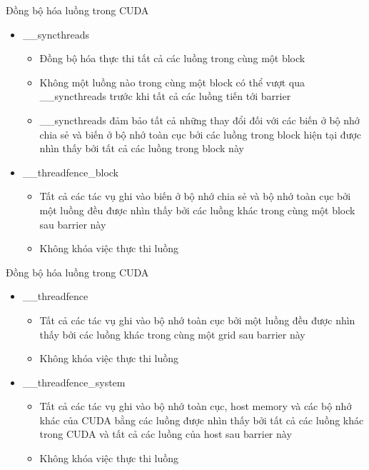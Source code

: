 \documentclass[10pt]{beamer}
\theoremstyle{remark}
\numberwithin{algocf}{section}
\numberwithin{equation}{section}
\numberwithin{dl}{section}
\numberwithin{figure}{section}
\begin{document}
\begin{frame}{Đồng bộ hóa luồng trong CUDA}
    \begin{itemize}
        \item \_\_syncthreads
        \begin{itemize}
            \item Đồng bộ hóa thực thi tất cả các luồng trong cùng một block
            \item Không một luồng nào trong cùng một block có thể vượt qua \_\_syncthreads trước khi tất cả các luồng tiến tới barrier 
            \item \_\_syncthreads đảm bảo tất cả những thay đổi đối với các biến ở bộ nhớ chia sẻ và biến ở bộ nhớ toàn cục bởi các luồng trong block hiện tại được nhìn thấy bởi tất cả các luồng trong block này
        \end{itemize}
        \item \_\_threadfence\_block
        \begin{itemize}
            \item Tất cả các tác vụ ghi vào biến ở bộ nhớ chia sẻ và bộ nhớ toàn cục bởi một luồng đều được nhìn thấy bởi các luồng khác trong cùng một block sau barrier này
            \item Không khóa việc thực thi luồng
        \end{itemize}
    \end{itemize}
\end{frame}

\begin{frame}{Đồng bộ hóa luồng trong CUDA}
    \begin{itemize}
        \item \_\_threadfence
        \begin{itemize}
            \item Tất cả các tác vụ ghi vào bộ nhớ toàn cục bởi một luồng đều được nhìn thấy bởi các luồng khác trong cùng một grid sau barrier này
            \item Không khóa việc thực thi luồng
        \end{itemize}
        \item \_\_threadfence\_system
        \begin{itemize}
            \item Tất cả các tác vụ ghi vào bộ nhớ toàn cục, host memory và các bộ nhớ khác của CUDA bằng các luồng được nhìn thấy bởi tất cả các luồng khác trong CUDA và tất cả các luồng của host sau barrier này 
            \item Không khóa việc thực thi luồng
        \end{itemize}
    \end{itemize}
\end{frame}
\end{document}
